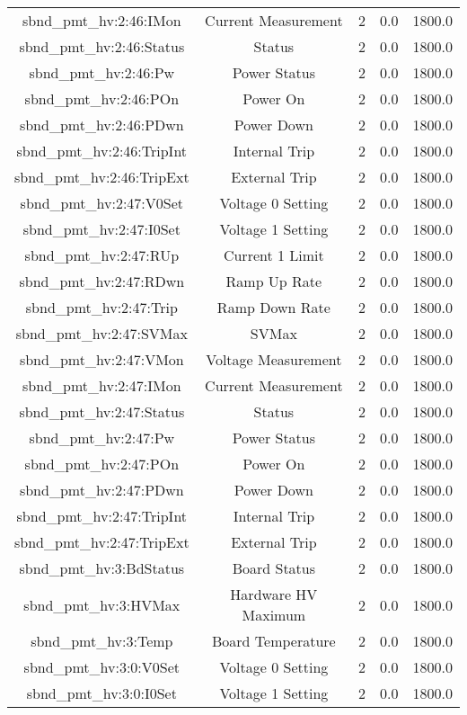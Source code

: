 \begin{table}[ptb]
\begin{tabular}{c | c c c c}
sbnd_pmt_hv:2:46:IMon & Current Measurement & 2 & 0.0 & 1800.0\\ 
sbnd_pmt_hv:2:46:Status & Status & 2 & 0.0 & 1800.0\\ 
sbnd_pmt_hv:2:46:Pw & Power Status & 2 & 0.0 & 1800.0\\ 
sbnd_pmt_hv:2:46:POn & Power On & 2 & 0.0 & 1800.0\\ 
sbnd_pmt_hv:2:46:PDwn & Power Down & 2 & 0.0 & 1800.0\\ 
sbnd_pmt_hv:2:46:TripInt & Internal Trip & 2 & 0.0 & 1800.0\\ 
sbnd_pmt_hv:2:46:TripExt & External Trip & 2 & 0.0 & 1800.0\\ 
sbnd_pmt_hv:2:47:V0Set & Voltage 0 Setting & 2 & 0.0 & 1800.0\\ 
sbnd_pmt_hv:2:47:I0Set & Voltage 1 Setting & 2 & 0.0 & 1800.0\\ 
sbnd_pmt_hv:2:47:RUp & Current 1 Limit & 2 & 0.0 & 1800.0\\ 
sbnd_pmt_hv:2:47:RDwn & Ramp Up Rate & 2 & 0.0 & 1800.0\\ 
sbnd_pmt_hv:2:47:Trip & Ramp Down Rate & 2 & 0.0 & 1800.0\\ 
sbnd_pmt_hv:2:47:SVMax & SVMax & 2 & 0.0 & 1800.0\\ 
sbnd_pmt_hv:2:47:VMon & Voltage Measurement & 2 & 0.0 & 1800.0\\ 
sbnd_pmt_hv:2:47:IMon & Current Measurement & 2 & 0.0 & 1800.0\\ 
sbnd_pmt_hv:2:47:Status & Status & 2 & 0.0 & 1800.0\\ 
sbnd_pmt_hv:2:47:Pw & Power Status & 2 & 0.0 & 1800.0\\ 
sbnd_pmt_hv:2:47:POn & Power On & 2 & 0.0 & 1800.0\\ 
sbnd_pmt_hv:2:47:PDwn & Power Down & 2 & 0.0 & 1800.0\\ 
sbnd_pmt_hv:2:47:TripInt & Internal Trip & 2 & 0.0 & 1800.0\\ 
sbnd_pmt_hv:2:47:TripExt & External Trip & 2 & 0.0 & 1800.0\\ 
sbnd_pmt_hv:3:BdStatus & Board Status & 2 & 0.0 & 1800.0\\ 
sbnd_pmt_hv:3:HVMax & Hardware HV Maximum & 2 & 0.0 & 1800.0\\ 
sbnd_pmt_hv:3:Temp & Board Temperature & 2 & 0.0 & 1800.0\\ 
sbnd_pmt_hv:3:0:V0Set & Voltage 0 Setting & 2 & 0.0 & 1800.0\\ 
sbnd_pmt_hv:3:0:I0Set & Voltage 1 Setting & 2 & 0.0 & 1800.0\\ 

\end{tabular}
\end{table}

